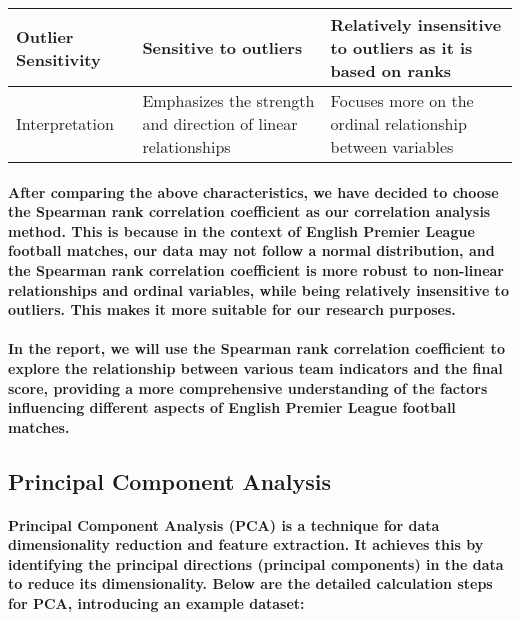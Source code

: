 \begin{table}[h]
\begin{tabularx}{\textwidth}{|p{2.5cm}|X|X|}
        \hline
        Outlier Sensitivity & Sensitive to outliers                                                                                                 & Relatively insensitive to outliers as it is based on ranks                                                                 \\
        \hline
        Interpretation      & Emphasizes the strength and direction of linear relationships                                                         & Focuses more on the ordinal relationship between variables                                                                 \\
        \hline
    \end{tabularx}
\end{table}
% 
% 
% 
\paragraph{After comparing the above characteristics, we have decided to choose the Spearman rank correlation coefficient as our correlation analysis method. This is because in the context of English Premier League football matches, our data may not follow a normal distribution, and the Spearman rank correlation coefficient is more robust to non-linear relationships and ordinal variables, while being relatively insensitive to outliers. This makes it more suitable for our research purposes.}
% 
% 
\paragraph{In the report, we will use the Spearman rank correlation coefficient to explore the relationship between various team indicators and the final score, providing a more comprehensive understanding of the factors influencing different aspects of English Premier League football matches.}
% 
% 
% 
\subsection{Principal Component Analysis}
% 
% 
% 
% 
% 
\paragraph{Principal Component Analysis (PCA) is a technique for data dimensionality reduction and feature extraction. It achieves this by identifying the principal directions (principal components) in the data to reduce its dimensionality. Below are the detailed calculation steps for PCA, introducing an example dataset:}
% 
% 
% 
% 

